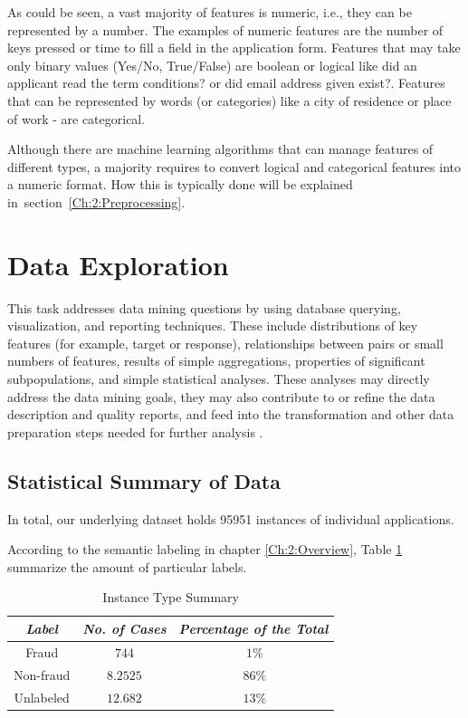 As could be seen, a vast majority of features is numeric, i.e., they can be represented by a number. The examples of numeric features are the number of keys pressed or time to fill a field in the application form. Features that may take only binary values (Yes/No, True/False) are boolean or logical like did an applicant read the term conditions? or did email address given exist?. Features that can be represented by words (or categories) like a city of residence or place of work - are categorical.

Although there are machine learning algorithms that can manage features of different types, a majority requires to convert logical and categorical features into a numeric format. How this is typically done will be explained in~section~\ref{Ch:2:Preprocessing}.

\section{Data Exploration}\label{Ch:2:Exploration}
This task addresses data mining questions by using database querying, visualization, and reporting techniques. These include distributions of key features (for example, target or response), relationships between pairs or small numbers of features, results of simple aggregations, properties of significant subpopulations, and simple statistical analyses. These analyses may directly address the data mining goals, they may also contribute to or refine the data description and quality reports, and feed into the transformation and other data preparation steps needed for further analysis \cite{crisp}.

\subsection{Statistical Summary of Data}\label{Ch:2:SSummary}
In total, our underlying dataset holds 95951 instances of individual applications.

According to the semantic labeling in chapter \ref{Ch:2:Overview}, Table \ref{tab:instance-summary} summarize the amount of particular labels.

\begin{table}[h!]
  \begin{center}
    \caption{Instance Type Summary}
    \label{tab:instance-summary}
    \begin{tabular}{|c|c|c|}\hline
    \textit{Label} & \textit{No. of Cases} & \textit{Percentage of the Total} \\
      \hline
     Fraud & \(744\) & \(~1\%\) \\ 
     \hline
     Non-fraud & \(8.2525\) &  \(~86\%\) \\
     \hline
     Unlabeled & \(12.682\) &  \(~13\%\) \\
     \hline
    \end{tabular}
  \end{center}
\end{table}

